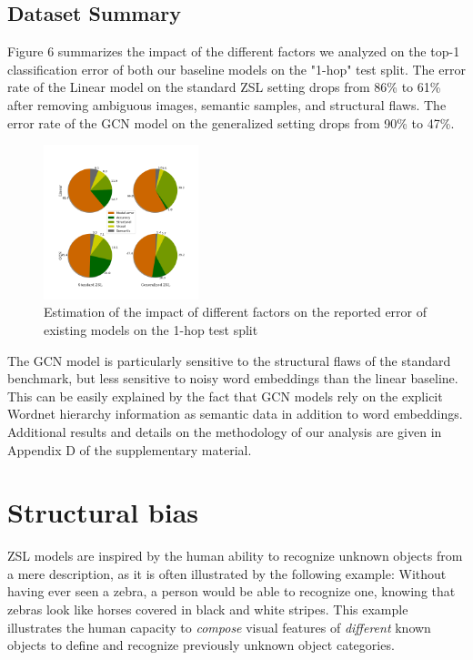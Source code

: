 \subsection{Dataset Summary}
Figure 6 summarizes the impact of the different factors we analyzed on the top-1 classification error of both our baseline models on the "1-hop" test split.
The error rate of the Linear model on the standard ZSL setting drops from 86\% to 61\% after removing ambiguous images, semantic samples, and structural flaws.
The error rate of the GCN model on the generalized setting drops from 90\% to 47\%.

\begin{figure}[h]
\centering
\includegraphics[width=0.4\textwidth]{Figure_7.png}
\caption{
Estimation of the impact of different factors on the reported error of existing models on the 1-hop test split
}
\end{figure}

The GCN model is particularly sensitive to the structural flaws of the standard benchmark, 
but less sensitive to noisy word embeddings than the linear baseline.
This can be easily explained by the fact that GCN models rely on 
the explicit Wordnet hierarchy information as semantic data in addition to word embeddings.
Additional results and details on the methodology of our analysis are given in Appendix D of the supplementary material.

\section{Structural bias}

ZSL models are inspired by the human ability to recognize unknown objects from a mere description, %
as it is often illustrated by the following example:
Without having ever seen a zebra, a person would be able to recognize one, 
knowing that zebras look like horses covered in black and white stripes.
This example illustrates the human capacity to \textit{compose} visual features of 
\textit{different} known objects to define and recognize previously unknown object categories.

